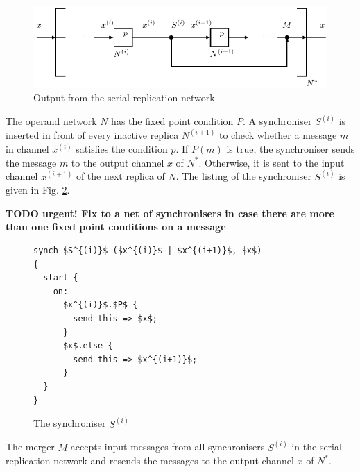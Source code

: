 \begin{figure}[h!]
\centering
\includegraphics[scale=0.8]{figs/chapter_04_ffp_out.pdf}
\caption{Output from the serial replication network}
\label{fig:ffp_out}
\end{figure}

The operand network $N$ has the fixed point condition $P$. A synchroniser $S^{(i)}$ is inserted in front of every inactive replica $N^{(i+1)}$ to check whether a message $m$ in channel $x^{(i)}$ satisfies the condition $p$. If $P(m)$ is true, the synchroniser sends the message $m$ to the output channel $x$ of $N^{*}$. Otherwise, it is sent to the input channel $x^{(i+1)}$ of the next replica of $N$. The listing of the synchroniser $S^{(i)}$ is given in Fig. \ref{ffp:synch_filt}.

\textbf{TODO urgent! Fix to a net of synchronisers in case there are more than one fixed point conditions on a message}
\begin{figure}[h!]
\begin{lstlisting}[frame=single,mathescape]
synch $S^{(i)}$ ($x^{(i)}$ | $x^{(i+1)}$, $x$)
{
  start {
    on:
      $x^{(i)}$.$P$ {
        send this => $x$;
      }
      $x$.else {
        send this => $x^{(i+1)}$;
      }
  }
}
\end{lstlisting}
\caption{The synchroniser $S^{(i)}$}
\label{ffp:synch_filt}
\end{figure}

The merger $M$ accepts input messages from all synchronisers $S^{(i)}$ in the serial replication network and resends the messages to the output channel $x$ of $N^{*}$.


